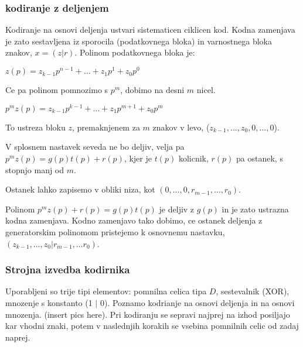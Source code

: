 \documentclass{article}
\begin{document}
\begin{multicols}{4}
\subsubsection{kodiranje z deljenjem}
Kodiranje na osnovi deljenja ustvari sistematicen ciklicen kod. Kodna zamenjava je zato sestavljena iz sporocila
(podatkovnega bloka) in varnostnega bloka znakov, $x = (z | r)$.
Polinom podatkovnega bloka je:
\begin{center}
    \begin{math}
        z(p) = z_{k-1}p^{n-1} + \dots + z_1p^{1} + z_0p^0
    \end{math}
\end{center}
Ce pa polinom pomnozimo s $p^m$, dobimo na desni $m$ nicel.
\begin{center}
    \begin{math}
        p^m z(p) = z_{k-1}p^{k-1} + \dots + z_1p^{m+1} + z_0p^m
    \end{math}
\end{center}
To ustreza bloku $z$, premaknjenem za $m$ znakov v levo, ($z_{k-1}, \dots, z_0, 0, \dots, 0$).

V splosnem nastavek seveda ne bo deljiv, velja pa $p^mz(p) = g(p)t(p) + r(p)$, kjer je $t(p)$ kolicnik,
$r(p)$ pa ostanek, s stopnjo manj od $m$.

Ostanek lahko zapisemo v obliki niza, kot $(0, \dots, 0, r_{m-1}, \dots, r_0)$.

Polinom $p^m z(p) + r(p) = g(p)t(p)$ je deljiv z $g(p)$ in je zato ustrazna kodna zamenjava.
Kodno zamenjavo tako dobimo, ce ostanek deljenja z generatorskim polinomom pristejemo k osnovnemu
nastavku, $(z_{k-1}, \dots, z_0 | r_{m-1}, \dots r_0)$.

\subsubsection{Strojna izvedba kodirnika}
Uporabljeni so trije tipi elementov: pomnilna celica tipa $D$, sestevalnik (XOR), mnozenje s konstanto (1 $|$ 0).
Poznamo kodrianje na osnovi deljenja in na osnovi mnozenja. (insert pics here).
Pri kodiranju se sepravi najprej na izhod posiljajo kar vhodni znaki, potem v naslednjih korakih se vsebina pomnilnih celic od zadaj naprej.


\end{multicols}
\end{document}
